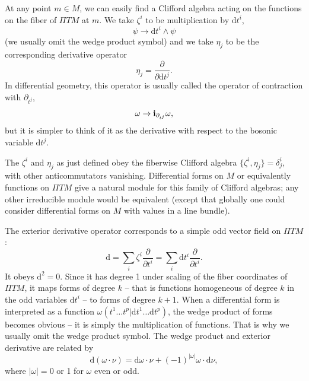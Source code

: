 \documentclass[11pt,a4paper]{article}
\def\d{{\mathrm d}}
\def\i{{\mathbf i}}
\def\Pi{\varPi}
\begin{document}
At any point $m\in M$, we can easily find a Clifford algebra acting on the functions on the fiber of ${\Pi} TM$ at $m$.
We take $\zeta^i$ to be  multiplication by $\d t^i$,
\begin{equation}\label{curtsy}\psi \to \d t^i\wedge \psi\end{equation}
(we usually omit the wedge product symbol) and
we take $\eta_j$ to be the corresponding derivative operator
\begin{equation}\label{styro}\eta_j=\frac{\partial}{\partial \d t^j}.\end{equation}
In differential geometry, this operator is usually called
the operator of contraction with $\partial_{t^j}$,
\begin{equation} \label{urtsy}\omega\to \i_{{\tiny\partial}_{t^j}}\omega,\end{equation}
but it is simpler to think of it as the derivative with respect to the bosonic variable $\d t^j$.



The $\zeta^i$ and $\eta_j$ as just defined obey the fiberwise Clifford algebra $\{\zeta^i,\eta_j\}=\delta^i_j$, with other anticommutators vanishing.
Differential forms on $M$ or equivalently functions on ${\Pi} TM$ give a natural module for this family of Clifford algebras; any other irreducible module would be
equivalent (except that globally  one could consider differential forms on $M$ with values in a line bundle).

The exterior derivative operator corresponds to a simple odd vector field on ${\Pi} TM$:
\begin{equation}\label{zomb}\d=\sum_i \zeta^i\frac{\partial}{\partial t^i} =\sum_i \d t^i\frac{\partial}{\partial t^i}.\end{equation}
It obeys $\d^2=0$.  Since it has degree 1 under scaling of the fiber coordinates of ${\Pi} TM$,  
it maps forms of degree $k$ -- that is functions homogeneous of degree $k$ in the odd variables $\d t^i$ -- to forms of degree $k+1$.  When a differential form is interpreted as a function $\omega(t^1\dots t^p|\d t^1\dots \d t^p)$,
the wedge product of forms becomes obvious -- it is simply the multiplication of functions.  That is why we usually omit the wedge product symbol.
The wedge product and exterior derivative are related by
\begin{equation}\label{udofl} \d(\omega\cdot \nu)= \d\omega \cdot \nu + (-1)^{|\omega|}\omega\cdot \d\nu,\end{equation}
where $|\omega|=0$ or 1 for $\omega$ even or odd.
\end{document}
